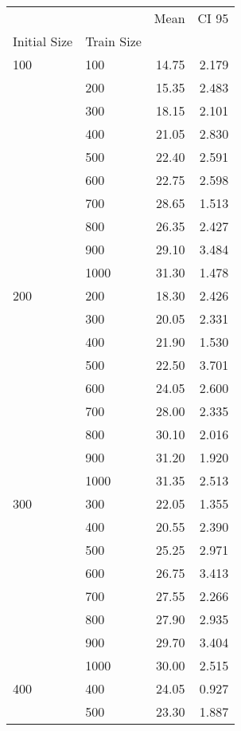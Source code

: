 \begin{tabular}{llrr}
\toprule
                &      &   Mean &  CI 95 \\
Initial Size & Train Size &        &        \\
\midrule
100 & 100  &  14.75 &  2.179 \\
                & 200  &  15.35 &  2.483 \\
                & 300  &  18.15 &  2.101 \\
                & 400  &  21.05 &  2.830 \\
                & 500  &  22.40 &  2.591 \\
                & 600  &  22.75 &  2.598 \\
                & 700  &  28.65 &  1.513 \\
                & 800  &  26.35 &  2.427 \\
                & 900  &  29.10 &  3.484 \\
                & 1000 &  31.30 &  1.478 \\
200 & 200  &  18.30 &  2.426 \\
                & 300  &  20.05 &  2.331 \\
                & 400  &  21.90 &  1.530 \\
                & 500  &  22.50 &  3.701 \\
                & 600  &  24.05 &  2.600 \\
                & 700  &  28.00 &  2.335 \\
                & 800  &  30.10 &  2.016 \\
                & 900  &  31.20 &  1.920 \\
                & 1000 &  31.35 &  2.513 \\
300 & 300  &  22.05 &  1.355 \\
                & 400  &  20.55 &  2.390 \\
                & 500  &  25.25 &  2.971 \\
                & 600  &  26.75 &  3.413 \\
                & 700  &  27.55 &  2.266 \\
                & 800  &  27.90 &  2.935 \\
                & 900  &  29.70 &  3.404 \\
                & 1000 &  30.00 &  2.515 \\
400 & 400  &  24.05 &  0.927 \\
                & 500  &  23.30 &  1.887 \\

\end{tabular}
